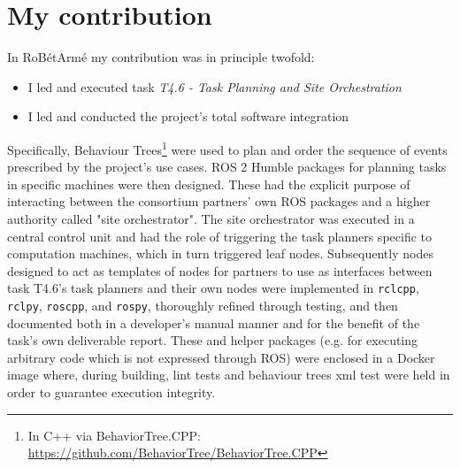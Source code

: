 \section{My contribution}

In RoBétArmé my contribution was in principle twofold:
\begin{itemize}
  \item I led and executed task \textit{T4.6 - Task Planning and Site Orchestration}
  \item I led and conducted the project's total software integration
\end{itemize}

Specifically, Behaviour Trees\footnote{In C++ via BehaviorTree.CPP:
\url{https://github.com/BehaviorTree/BehaviorTree.CPP}} were used to plan and
order the sequence of events prescribed by the project's use cases. ROS 2
Humble packages for planning tasks in specific machines were then designed.
These had the explicit purpose of interacting between the consortium partners'
own ROS packages and a higher authority called "site orchestrator". The site
orchestrator was executed in a central control unit and had the role of
triggering the task planners specific to computation machines, which in turn
triggered leaf nodes. Subsequently nodes designed to act as templates of nodes
for partners to use as interfaces between task T4.6's task planners and their
own nodes were implemented in \texttt{rclcpp}, \texttt{rclpy}, \texttt{roscpp},
and \texttt{rospy}, thoroughly refined through testing, and then documented
both in a developer's manual manner and for the benefit of the task's own
deliverable report. These and helper packages (e.g. for executing arbitrary
code which is not expressed through ROS) were enclosed in a Docker image where,
during building, lint tests and behaviour trees xml test were held in order to
guarantee execution integrity.

